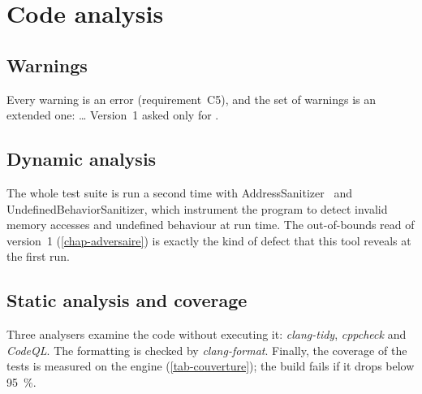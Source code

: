 \section{Code analysis}

\subsection{Warnings}

Every warning is an error (requirement~C5), and the set of warnings is an extended one:
\dots{} Version~1 asked only for .

\subsection{Dynamic analysis}
\label{sec-sanitizers}

The whole test suite is run a second time with AddressSanitizer~\cite{serebryany2012} and
UndefinedBehaviorSanitizer, which instrument the program to detect invalid memory accesses
and undefined behaviour at run time. The out-of-bounds read of version~1
(\cref{chap-adversaire}) is exactly the kind of defect that this tool reveals at the first
run.

\subsection{Static analysis and coverage}

Three analysers examine the code without executing it: \emph{clang-tidy}, \emph{cppcheck} and
\emph{CodeQL}. The formatting is checked by \emph{clang-format}. Finally, the coverage of the
tests is measured on the engine (\cref{tab-couverture}); the build fails if it drops below
\SI{95}{\percent}.

